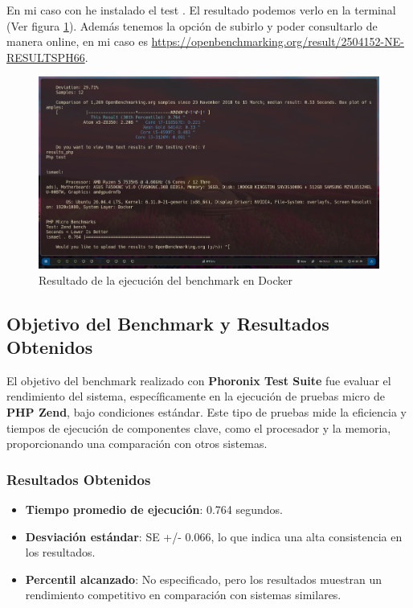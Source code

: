 En mi caso con he instalado el test . El resultado podemos verlo en la terminal (Ver figura \ref{fig:dockerPhoronix}). Además tenemos la opción de subirlo y poder consultarlo de manera online, en mi caso es \url{https://openbenchmarking.org/result/2504152-NE-RESULTSPH66}.

\begin{figure}[H]
    \centering
    \includegraphics[width=1\textwidth]{images/Bloque2/dockerPhoronix.png}
    \caption{Resultado de la ejecución del benchmark en Docker}
    \label{fig:dockerPhoronix}
\end{figure}

\subsection*{Objetivo del Benchmark y Resultados Obtenidos}

El objetivo del benchmark realizado con \textbf{Phoronix Test Suite} fue evaluar el rendimiento del sistema, específicamente en la ejecución de pruebas micro de \textbf{PHP Zend}, bajo condiciones estándar. Este tipo de pruebas mide la eficiencia y tiempos de ejecución de componentes clave, como el procesador y la memoria, proporcionando una comparación con otros sistemas.

\subsubsection{Resultados Obtenidos}

\begin{itemize}
    \item \textbf{Tiempo promedio de ejecución}: 0.764 segundos.
    \item \textbf{Desviación estándar}: SE +/- 0.066, lo que indica una alta consistencia en los resultados.
    \item \textbf{Percentil alcanzado}: No especificado, pero los resultados muestran un rendimiento competitivo en comparación con sistemas similares.
\end{itemize}

